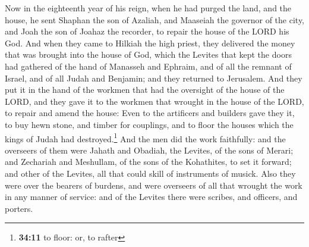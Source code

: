  Now in the eighteenth year of his reign, when he had
purged the land, and the house, he sent Shaphan the son of Azaliah, and
Maaseiah the governor of the city, and Joah the son of Joahaz the
recorder, to repair the house of the LORD his God.  And
when they came to Hilkiah the high priest, they delivered the money that
was brought into the house of God, which the Levites that kept the doors
had gathered of the hand of Manasseh and Ephraim, and of all the remnant
of Israel, and of all Judah and Benjamin; and they returned to
Jerusalem.  And they put it in the hand of the workmen
that had the oversight of the house of the LORD, and they gave it to the
workmen that wrought in the house of the LORD, to repair and amend the
house:  Even to the artificers and builders gave they it,
to buy hewn stone, and timber for couplings, and to floor the houses
which the kings of Judah had destroyed.\footnote{\textbf{34:11} to
  floor: or, to rafter}  And the men did the work
faithfully: and the overseers of them were Jahath and Obadiah, the
Levites, of the sons of Merari; and Zechariah and Meshullam, of the sons
of the Kohathites, to set it forward; and other of the Levites, all that
could skill of instruments of musick.  Also they were
over the bearers of burdens, and were overseers of all that wrought the
work in any manner of service: and of the Levites there were scribes,
and officers, and porters.

